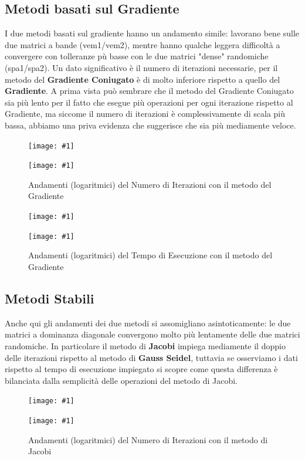 \documentclass[a4paper,11pt,oneside, table]{article}
\newcommand{\putsubimage}[5] {
  \begin{minipage}{{#4}\linewidth}
	    \centering
      \texttt{[image: \#1]}
	    \caption{#2}\label{#3}
	\end{minipage}
}
\newcommand{\putimagecouple}[2] {
  \begin{figure}[!htb]
      \centering
      #1
      \hspace{0.5cm}
      #2
  \end{figure}
}
\begin{document}
\subsection{Metodi basati sul Gradiente}

I due metodi basati sul gradiente hanno un andamento simile: lavorano bene sulle due matrici a bande (vem1/vem2), mentre hanno qualche leggera difficolt\`a a convergere con tolleranze p\`u basse con le due matrici "dense" randomiche (spa1/spa2).
Un dato significativo \`e il numero di iterazioni necessarie, per il metodo del \textbf{Gradiente Coniugato} \`e di molto inferiore rispetto a quello del \textbf{Gradiente}. A prima vista pu\`o sembrare che il metodo del Gradiente Coniugato sia pi\`u lento per il fatto che esegue pi\`u operazioni per ogni iterazione rispetto al Gradiente, ma siccome il numero di iterazioni \`e complessivamente di scala pi\`u bassa, abbiamo una priva evidenza che suggerisce che sia pi\`u mediamente veloce.

\putimagecouple
  {\putsubimage{./images/it-re-cge.png}{Andamenti (logaritmici) del Numero di Iterazioni con il metodo del Gradiente Coniugato}{png:it-re-cge}{0.4}{0.9}}
  {\putsubimage{./images/it-re-gre.png}{Andamenti (logaritmici) del Numero di Iterazioni con il metodo del Gradiente}{png:it-re-gre}{0.4}{0.9}}

\putimagecouple
  {\putsubimage{./images/te-re-cge.png}{Andamenti (logaritmici) del Tempo di Esecuzione con il metodo del Gradiente Coniugato}{png:te-re-cge}{0.4}{0.9}}
  {\putsubimage{./images/te-re-gre.png}{Andamenti (logaritmici) del Tempo di Esecuzione con il metodo del Gradiente}{png:te-re-gre}{0.4}{0.9}}

\subsection{Metodi Stabili}

Anche qui gli andamenti dei due metodi si assomigliano asintoticamente: le due matrici a dominanza diagonale convergono molto pi\`u lentamente delle due matrici randomiche. In particolare il metodo di \textbf{Jacobi} impiega mediamente il doppio delle iterazioni rispetto al metodo di \textbf{Gauss Seidel}, tuttavia se osserviamo i dati rispetto al tempo di esecuzione impiegato si scopre come questa differenza \`e bilanciata dalla semplicit\`a delle operazioni del metodo di Jacobi.

\putimagecouple
  {\putsubimage{./images/it-re-gse.png}{Andamenti (logaritmici) del Numero di Iterazioni con il metodo di Gauss Seidel}{png:it-re-gse}{0.4}{0.9}}
  {\putsubimage{./images/it-re-jae.png}{Andamenti (logaritmici) del Numero di Iterazioni con il metodo di Jacobi}{png:it-re-jae}{0.4}{0.9}}
\end{document}
